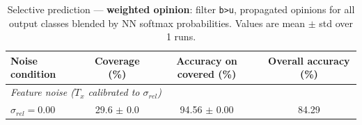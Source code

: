 \begin{table}[ht]
\centering
\caption{Selective prediction — \textbf{weighted opinion}: filter \texttt{b>u}, propagated opinions for all output classes blended by NN softmax probabilities. Values are mean $\pm$ std over 1 runs.}
\label{tab:thresh-wt-0-5}
\begin{tabular}{lccc}
\toprule
Noise condition & Coverage (\%) & Accuracy on covered (\%) & Overall accuracy (\%) \\
\midrule
\multicolumn{4}{l}{\textit{Feature noise ($T_x$ calibrated to $\sigma_{rel}$)}} \\
$\sigma_{rel}=0.00$ & 29.6 $\pm$ 0.0 & 94.56 $\pm$ 0.00 & 84.29 \\
\bottomrule
\end{tabular}
\end{table}